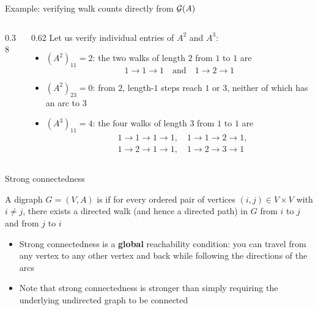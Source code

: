 \documentclass[aspectratio=169]{beamer}\usepackage[]{graphicx}\usepackage[]{xcolor}
\begin{document}
\begin{frame}{Example: verifying walk counts directly from $\mathcal{G}(A)$}
\begin{columns}[c]
\begin{column}{0.38\textwidth}
\centering
{}
\end{column}
\begin{column}{0.62\textwidth}
Let us verify individual entries of $A^2$ and $A^3$:
\begin{itemize}
\item $(A^2)_{11} = 2$: the two walks of length $2$ from $1$ to $1$ are
\[
1 \to 1 \to 1 \quad \text{and} \quad 1 \to 2 \to 1
\]
\item $(A^2)_{23} = 0$: from $2$, length-$1$ steps reach $1$ or $3$, neither of which has an arc to $3$
\item $(A^3)_{11} = 4$: the four walks of length $3$ from $1$ to $1$ are
\begin{align*}
&1 \to 1 \to 1 \to 1, \quad 1 \to 1 \to 2 \to 1, \\
&1 \to 2 \to 1 \to 1, \quad 1 \to 2 \to 3 \to 1
\end{align*}
\end{itemize}
\end{column}
\end{columns}
\end{frame}



\begin{frame}{Strong connectedness}
\begin{importantdefinition}
A digraph $G = (V, A)$ is  if for every ordered pair of vertices $(i, j) \in V \times V$ with $i \neq j$, there exists a directed walk (and hence a directed path) in $G$ from $i$ to $j$ and from $j$ to $i$
\end{importantdefinition}
\vfill
\begin{itemize}
\item Strong connectedness is a \textbf{global} reachability condition: you can travel from any vertex to any other vertex and back while following the directions of the arcs
\item Note that strong connectedness is stronger than simply requiring the underlying undirected graph to be connected
\end{itemize}
\end{frame}
\end{document}
